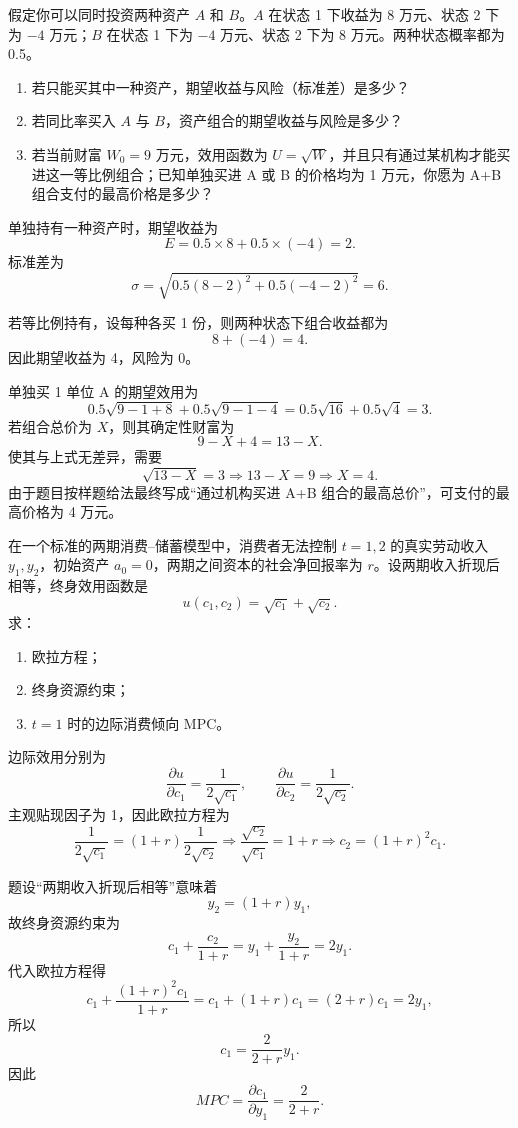 \begin{question}
假定你可以同时投资两种资产 $A$ 和 $B$。$A$ 在状态 1 下收益为 8 万元、状态 2 下为 $-4$ 万元；$B$ 在状态 1 下为 $-4$ 万元、状态 2 下为 8 万元。两种状态概率都为 0.5。
\begin{enumerate}[label=(\alph*),leftmargin=2.5em]
  \item 若只能买其中一种资产，期望收益与风险（标准差）是多少？
  \item 若同比率买入 $A$ 与 $B$，资产组合的期望收益与风险是多少？
  \item 若当前财富 $W_0=9$ 万元，效用函数为 $U=\sqrt{W}$，并且只有通过某机构才能买进这一等比例组合；已知单独买进 A 或 B 的价格均为 1 万元，你愿为 A+B 组合支付的最高价格是多少？
\end{enumerate}
\begin{solution}
单独持有一种资产时，期望收益为
\[
E=0.5\times 8+0.5\times (-4)=2.
\]
标准差为
\[
\sigma=\sqrt{0.5(8-2)^2+0.5(-4-2)^2}=6.
\]

若等比例持有，设每种各买 1 份，则两种状态下组合收益都为
\[
8+(-4)=4.
\]
因此期望收益为 4，风险为 0。

单独买 1 单位 A 的期望效用为
\[
0.5\sqrt{9-1+8}+0.5\sqrt{9-1-4}=0.5\sqrt{16}+0.5\sqrt4=3.
\]
若组合总价为 $X$，则其确定性财富为
\[
9-X+4=13-X.
\]
使其与上式无差异，需要
\[
\sqrt{13-X}=3\Rightarrow 13-X=9\Rightarrow X=4.
\]
由于题目按样题给法最终写成“通过机构买进 A+B 组合的最高总价”，可支付的最高价格为 4 万元。\end{solution}
\end{question}

\begin{question}
在一个标准的两期消费--储蓄模型中，消费者无法控制 $t=1,2$ 的真实劳动收入 $y_1,y_2$，初始资产 $a_0=0$，两期之间资本的社会净回报率为 $r$。设两期收入折现后相等，终身效用函数是
\[
u(c_1,c_2)=\sqrt{c_1}+\sqrt{c_2}.
\]
求：
\begin{enumerate}[label=(\alph*),leftmargin=2.5em]
  \item 欧拉方程；
  \item 终身资源约束；
  \item $t=1$ 时的边际消费倾向 MPC。
\end{enumerate}
\begin{solution}
边际效用分别为
\[
\frac{\partial u}{\partial c_1}=\frac{1}{2\sqrt{c_1}},\qquad \frac{\partial u}{\partial c_2}=\frac{1}{2\sqrt{c_2}}.
\]
主观贴现因子为 1，因此欧拉方程为
\[
\frac{1}{2\sqrt{c_1}}=(1+r)\frac{1}{2\sqrt{c_2}}
\Rightarrow \frac{\sqrt{c_2}}{\sqrt{c_1}}=1+r
\Rightarrow c_2=(1+r)^2c_1.
\]

题设“两期收入折现后相等”意味着
\[
y_2=(1+r)y_1,
\]
故终身资源约束为
\[
c_1+\frac{c_2}{1+r}=y_1+\frac{y_2}{1+r}=2y_1.
\]
代入欧拉方程得
\[
c_1+\frac{(1+r)^2c_1}{1+r}=c_1+(1+r)c_1=(2+r)c_1=2y_1,
\]
所以
\[
c_1=\frac{2}{2+r}y_1.
\]
因此
\[
MPC=\frac{\partial c_1}{\partial y_1}=\frac{2}{2+r}.
\]
\end{solution}
\end{question}

